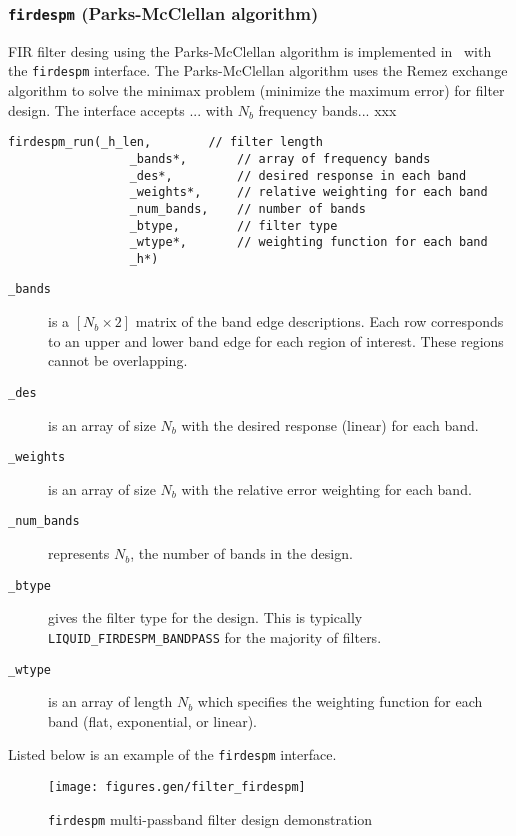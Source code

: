 \subsubsection{{\tt firdespm} (Parks-McClellan algorithm)}
\label{module:filter:firdespm}
FIR filter desing using the Parks-McClellan algorithm is implemented in
\liquid\ with the {\tt firdespm} interface.
The Parks-McClellan algorithm uses the Remez exchange algorithm to solve
the minimax problem (minimize the maximum error) for filter design.
The interface accepts ... with $N_b$ frequency bands... xxx
%
\begin{Verbatim}[fontsize=\small]
    firdespm_run(_h_len,        // filter length
                 _bands*,       // array of frequency bands
                 _des*,         // desired response in each band
                 _weights*,     // relative weighting for each band
                 _num_bands,    // number of bands
                 _btype,        // filter type
                 _wtype*,       // weighting function for each band
                 _h*)
\end{Verbatim}
%
\begin{description}
\item[{\tt \_bands}]
    is a $[N_b \times 2]$ matrix of the band edge descriptions.
    Each row corresponds to an upper and lower band edge for each region
    of interest.
    These regions cannot be overlapping.
\item[{\tt \_des}]
    is an array of size $N_b$ with the desired response (linear) for
    each band.
\item[{\tt \_weights}]
    is an array of size $N_b$ with the relative error weighting for each
    band.
\item[{\tt \_num\_bands}]
    represents $N_b$, the number of bands in the design.
\item[{\tt \_btype}]
    gives the filter type for the design.
    This is typically {\tt LIQUID\_FIRDESPM\_BANDPASS} for the majority
    of filters.
\item[{\tt \_wtype}]
    is an array of length $N_b$ which specifies the weighting function
    for each band (flat, exponential, or linear).
\end{description}
%
Listed below is an example of the {\tt firdespm} interface.
%



\begin{figure}
\centering
  \texttt{[image: figures.gen/filter\_firdespm]}
\caption{{\tt firdespm} multi-passband filter design demonstration}
\label{fig:module:filter:firdespm}
\end{figure}

